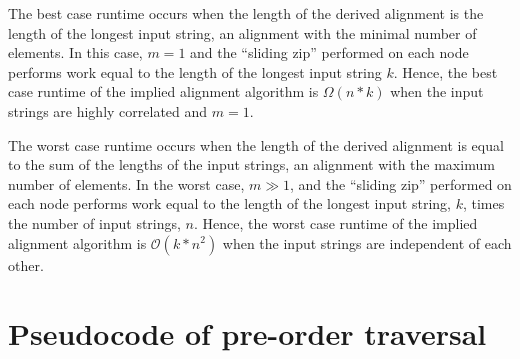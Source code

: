 \documentclass[11pt]{article}
\begin{document}
The best case runtime occurs when the length of the derived alignment is the length of the longest input string, an alignment with the minimal number of elements.
In this case, $m = 1$ and the ``sliding zip'' performed on each node performs work equal to the length of the longest input string $k$.
Hence, the best case runtime of the implied alignment algorithm is $\Omega(n*k)$ when the input strings are highly correlated and $m = 1$.

The worst case runtime occurs when the length of the derived alignment is equal to the sum of the lengths of the input strings, an alignment with the maximum number of elements.
In the worst case, $m \gg 1$, and the ``sliding zip'' performed on each node performs work equal to the length of the longest input string, $k$, times the number of input strings, $n$.
Hence, the worst case runtime of the implied alignment algorithm is $\mathcal{O}(k * n^2)$ when the input strings are independent of each other.



\section{Pseudocode of pre-order traversal}
\end{document}
